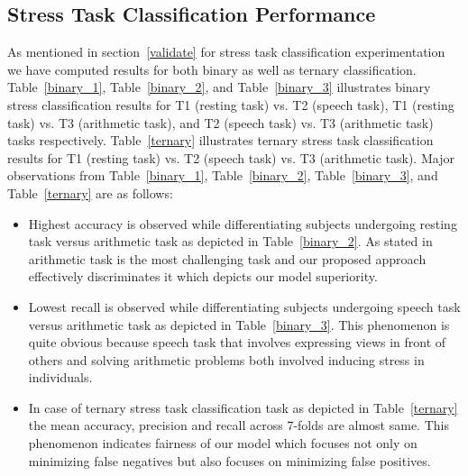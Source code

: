 \subsection{Stress Task Classification Performance} As mentioned in section~\ref{validate} for stress task classification experimentation we have computed results for both binary as well as ternary classification.
Table~\ref{binary_1}, Table~\ref{binary_2}, and Table~\ref{binary_3} illustrates  binary stress classification results for T1 (resting task) vs. T2 (speech task), T1 (resting task) vs. T3 (arithmetic task), and T2 (speech task) vs. T3 (arithmetic task) tasks respectively. Table~\ref{ternary} illustrates ternary stress task classification results for  T1 (resting task) vs. T2 (speech task) vs. T3 (arithmetic task). Major observations from  Table~\ref{binary_1}, Table~\ref{binary_2}, Table~\ref{binary_3}, and Table~\ref{ternary} are as follows:
\begin {itemize}
\item  Highest accuracy is observed while differentiating subjects undergoing resting task versus  arithmetic task as depicted in Table~\ref{binary_2}. As stated in ~\cite{ziaratnia2024multimodal} arithmetic task is the most challenging task  and our proposed approach effectively discriminates it which depicts our model superiority.
\item Lowest  recall  is observed while differentiating subjects undergoing speech task versus  arithmetic task as depicted in Table~\ref{binary_3}. This phenomenon is quite obvious because speech task that involves expressing views in front of others and solving arithmetic problems both involved inducing stress in individuals.
\item  In case  of ternary stress task classification task as depicted in Table~\ref{ternary} the mean accuracy, precision  and recall across 7-folds are almost same. This phenomenon indicates fairness of our model which  focuses not only  on minimizing false negatives but also focuses on minimizing false positives.
\end {itemize}
